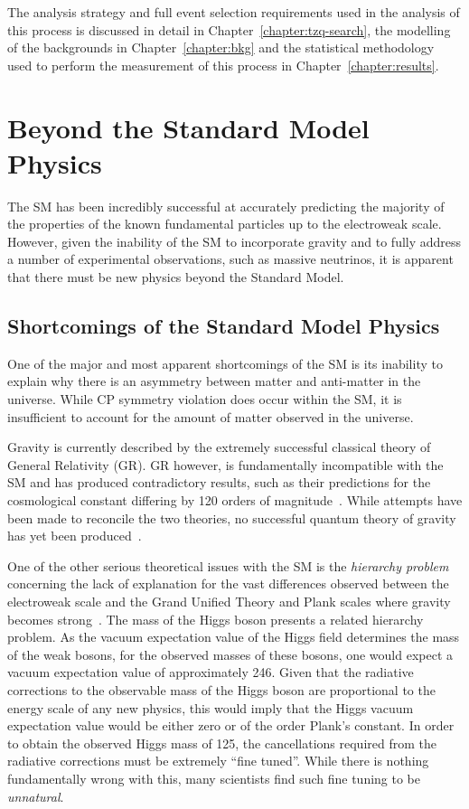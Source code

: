 The analysis strategy and full event selection requirements used in the analysis of this process is discussed in detail in Chapter~\ref{chapter:tzq-search}, the modelling of the backgrounds in Chapter~\ref{chapter:bkg} and the statistical methodology used to perform the measurement of this process in Chapter~\ref{chapter:results}.

\section{Beyond the Standard Model Physics}\label{sec:bsm}
The SM has been incredibly successful at accurately predicting the majority of the properties of the known fundamental particles up to the electroweak scale.
However, given the inability of the SM to incorporate gravity and to fully address a number of experimental observations, such as massive neutrinos, it is apparent that there must be new physics beyond the Standard Model.

\subsection{Shortcomings of the Standard Model Physics}\label{subsec:shortcomings}
One of the major and most apparent shortcomings of the SM is its inability to explain why there is an asymmetry between matter and anti-matter in the universe.
While CP symmetry violation does occur within the SM, it is insufficient to account for the amount of matter observed in the universe.

Gravity is currently described by the extremely successful classical theory of General Relativity (GR).
GR however, is fundamentally incompatible with the SM and  has produced contradictory results, such as their predictions for the cosmological constant differing by 120 orders of magnitude~\cite{Adler:1995vd}.
While attempts have been made to reconcile the two theories, no successful quantum theory of gravity has yet been produced~\cite{Sola:2013gha}.	

One of the other serious theoretical issues with the SM is the \emph{hierarchy problem} concerning the lack of explanation for the vast differences observed between the electroweak scale and the Grand Unified Theory and Plank scales where gravity becomes strong~\cite{Burdman:2007ck}.
The mass of the Higgs boson presents a related hierarchy problem.
As the vacuum expectation value of the Higgs field determines the mass of the weak bosons, for the observed masses of these bosons, one would expect a vacuum expectation value of approximately 246\GeV.
Given that the radiative corrections to the observable mass of the Higgs boson are proportional to the energy scale of any new physics, this would imply that the Higgs vacuum expectation value would be either zero or of the order Plank's constant.
In order to obtain the observed Higgs mass of 125\GeV, the cancellations required from the radiative corrections must be extremely ``fine tuned''.
While there is nothing fundamentally wrong with this, many scientists find such fine tuning to be \emph{unnatural}.

